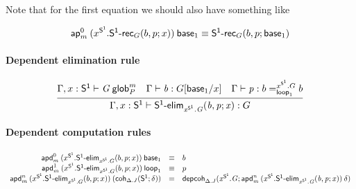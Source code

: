 Note that for the first equation we should also have something like
\begin{small}
  \[\mathsf{ap}^{0}_{m} \: {(x^{\mathsf{S^1}}.\mathsf{S^1\text{-}rec}_G(b, p; x))} \: {\mathsf{base}_{1}}
  \equiv \mathsf{S^1\text{-}rec}_G(b, p; \mathsf{base}_{1})\]
\end{small}

\paragraph{Dependent elimination rule}

\begin{small}
  \[
  \infer{\ofglob{\Gamma,x:\dsd{S^1}}{\dsd{S^1\text{-}elim}_{x^{\dsd{S^1}}.G}(b,
      p; x)}{G}} {\wfglob{\Gamma,x:\dsd{S^1}}{G}{m}{P} &
    \ofglob{\Gamma}{b}{G[\base{1}/x]} &
    \ofglob{\Gamma}{p}{\dhomj{x^{\dsd{S^1}}.G}{b}{b}{\lp{1}}}}
  \]
\end{small}

\paragraph{Dependent computation rules}

\begin{small}
  \[
  \begin{array}{rcl}
    \mathsf{apd}^{0}_{m} \: {(x^{\mathsf{S^1}}.\mathsf{S^1\text{-}elim}_{x^{\mathsf{S^1}}.G}(b, p; x))} \: {\mathsf{base}_{1}} & \equiv & b \\
    \mathsf{apd}^{1}_{m} \: {(x^{\mathsf{S^1}}.\mathsf{S^1\text{-}elim}_{x^{\mathsf{S^1}}.G}(b, p; x))} \: {\mathsf{loop}_{1}} & \equiv & p\\
    \mathsf{apd}^{n}_{m} \: {(x^{\mathsf{S^1}}.\mathsf{S^1\text{-}elim}_{x^{\mathsf{S^1}}.G}(b, p; x))} \: {(\mathsf{coh}_{\Delta.J} \mathit{(\mathsf{S^1};\delta)})} & \equiv &
    \mathsf{depcoh}_{\Delta.J} \mathit{(x^{\mathsf{S^1}}.G;\mathsf{apd}^{n}_{m} \: {(x^{\mathsf{S^1}}.\mathsf{S^1\text{-}elim}_{x^{\mathsf{S^1}}.G}(b, p; x))} \: {\delta})}
    \\
  \end{array}
  \]
\end{small}


